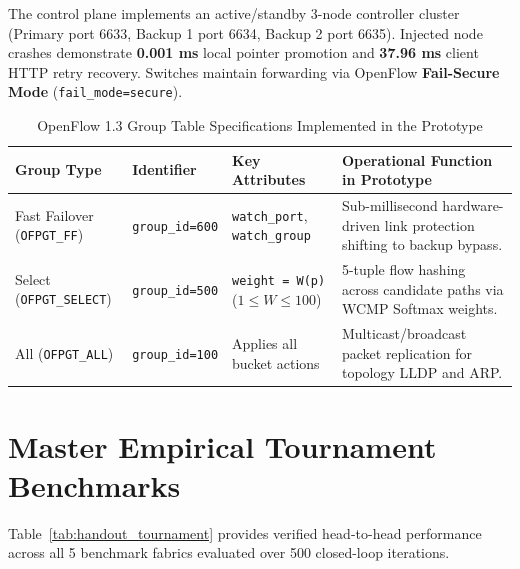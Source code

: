 \documentclass[10pt,a4paper]{article}
\newcommand{\code}[1]{\texttt{#1}}
\begin{document}
The control plane implements an active/standby 3-node controller cluster (Primary port 6633, Backup 1 port 6634, Backup 2 port 6635). Injected node crashes demonstrate \textbf{0.001 ms} local pointer promotion and \textbf{37.96 ms} client HTTP retry recovery. Switches maintain forwarding via OpenFlow \textbf{Fail-Secure Mode} (\code{fail\_mode=secure}).

\begin{table}[htbp]
\centering
\caption{OpenFlow 1.3 Group Table Specifications Implemented in the Prototype}
\label{tab:handout_groups}
\scriptsize
\setlength{\tabcolsep}{3pt}
\begin{tabularx}{\textwidth}{l l p{3.6cm} X}
\toprule
\textbf{Group Type} & \textbf{Identifier} & \textbf{Key Attributes} & \textbf{Operational Function in Prototype} \\
\midrule
Fast Failover (\code{OFPGT\_FF}) & \code{group\_id=600} & \code{watch\_port}, \code{watch\_group} & Sub-millisecond hardware-driven link protection shifting to backup bypass. \\
Select (\code{OFPGT\_SELECT}) & \code{group\_id=500} & \code{weight = W(p)} ($1 \le W \le 100$) & 5-tuple flow hashing across candidate paths via WCMP Softmax weights. \\
All (\code{OFPGT\_ALL}) & \code{group\_id=100} & Applies all bucket actions & Multicast/broadcast packet replication for topology LLDP and ARP. \\
\bottomrule
\end{tabularx}
\end{table}

\newpage


\section{Master Empirical Tournament Benchmarks}
Table~\ref{tab:handout_tournament} provides verified head-to-head performance across all 5 benchmark fabrics evaluated over 500 closed-loop iterations.
\end{document}
